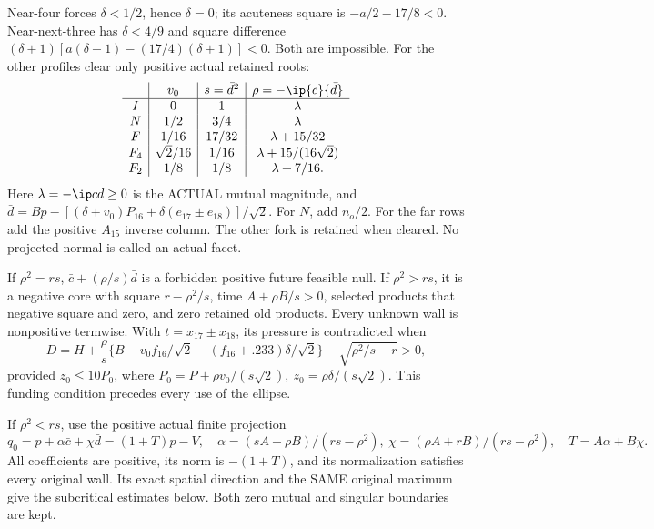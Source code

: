 Near-four forces \(\delta<1/2\), hence \(\delta=0\);
its acuteness square is \(-a/2-17/8<0\).
Near-next-three has \(\delta<4/9\) and square difference
\((\delta+1)[a(\delta-1)-(17/4)(\delta+1)]<0\).
Both are impossible.
For the other profiles clear only positive actual retained roots:
\[
\begin{array}{c|c|c|c}
 &v_0&s=\bar d^2&\rho=-\ip{\bar c}{\bar d}\\ \hline
I&0&1&\lambda\\
N&1/2&3/4&\lambda\\
F&1/16&17/32&\lambda+15/32\\
F_4&\sqrt2/16&1/16&\lambda+15/(16\sqrt2)\\
F_2&1/8&1/8&\lambda+7/16 .
\end{array}
\]
Here \(\lambda=-\ip cd\geq0\) is the ACTUAL mutual magnitude,
and
\(\bar d=Bp-[(\delta+v_0)P_{16}
+\delta(e_{17}\pm e_{18})]/\sqrt2\).
For \(N\), add \(n_o/2\).
For the far rows add the positive \(A_{15}\) inverse column.
The other fork is retained when cleared.
No projected normal is called an actual facet.

If \(\rho^2=rs\), \(\bar c+(\rho/s)\bar d\) is a forbidden
positive future feasible null.
If \(\rho^2>rs\), it is a negative core with square
\(r-\rho^2/s\), time \(A+\rho B/s>0\), selected products
that negative square and zero, and zero retained old products.
Every unknown wall is nonpositive termwise.
With \(t=x_{17}\pm x_{18}\), its pressure is contradicted when
\begin{equation}\label{eq:D18puregap}
 D=H+\frac{\rho}{s}
 \{B-v_0f_{16}/\sqrt2-(f_{16}+.233)\delta/\sqrt2\}
       -\sqrt{\rho^2/s-r}>0 ,
\end{equation}
provided \(z_0\leq10P_0\), where
\(P_0=P+\rho v_0/(s\sqrt2),\
z_0=\rho\delta/(s\sqrt2)\).
This funding condition precedes every use of the ellipse.

If \(\rho^2<rs\), use the positive actual finite projection
\[
 q_0=p+\alpha\bar c+\chi\bar d=(1+T)p-V,\quad
 \alpha=(sA+\rho B)/(rs-\rho^2),\
 \chi=(\rho A+rB)/(rs-\rho^2),\quad T=A\alpha+B\chi .
\]
All coefficients are positive, its norm is \(-(1+T)\), and its
normalization satisfies every original wall.
Its exact spatial direction and the SAME original maximum give
the subcritical estimates below. Both zero mutual and singular
boundaries are kept.

